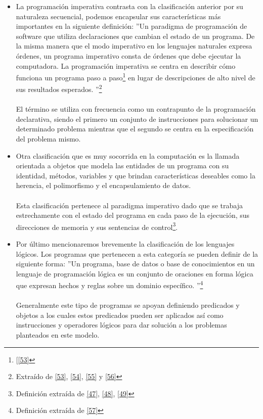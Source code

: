 \begin{itemize}
        \item  La programación imperativa contrasta con la clasificación anterior por su naturaleza secuencial, podemos encapsular sus características más importantes en la siguiente definición: 
         ''Un paradigma de programación de software que utiliza declaraciones que cambian el estado de un programa. De la misma manera que el modo imperativo en los lenguajes naturales expresa órdenes, un programa imperativo consta de órdenes que debe ejecutar la computadora. La programación imperativa se centra en describir cómo funciona un programa paso a paso\footnote{[\hyperlink{53}{[53]}} en lugar de descripciones de alto nivel de sus resultados esperados. ''\footnote{Extraído de \hyperlink{53}{[53]}, \hyperlink{54}{[54]}, \hyperlink{55}{[55]} y \hyperlink{56}{[56]}}\\\\
        El término se utiliza con frecuencia como un contrapunto de la programación declarativa, siendo el primero un conjunto de instrucciones para solucionar un determinado problema mientras que el segundo se centra en la especificación del problema mismo.\\

        \item     Otra clasificación que es muy socorrida en la computación es la llamada orientada a objetos que modela las entidades de un programa con su identidad, métodos, variables y que brindan características deseables como la herencia, el polimorfismo y el encapsulamiento de datos.\\\\
        Esta clasificación pertenece al paradigma imperativo dado que se trabaja estrechamente con el estado del programa en cada paso de la ejecución, sus direcciones de memoria y sus sentencias de control\footnote{Definición extraída de \hyperlink{47}{[47]}, \hyperlink{48}{[48]}, \hyperlink{49}{[49]}}.\\
    
        \item     Por último mencionaremos brevemente la clasificación de los lenguajes lógicos. Los programas que pertenecen a esta categoría se pueden definir de la siguiente forma:  ''Un programa, base de datos o base de conocimientos en un lenguaje de programación lógica es un conjunto de oraciones en forma lógica que expresan hechos y reglas sobre un dominio específico. ''\footnote{Definición extraída de \hyperlink{57}{[57]}} \\\\
        Generalmente este tipo de programas se apoyan definiendo predicados y objetos a los cuales estos predicados pueden ser aplicados así como instrucciones y operadores lógicos para dar solución a los problemas planteados en este modelo.

    
    \end{itemize}

